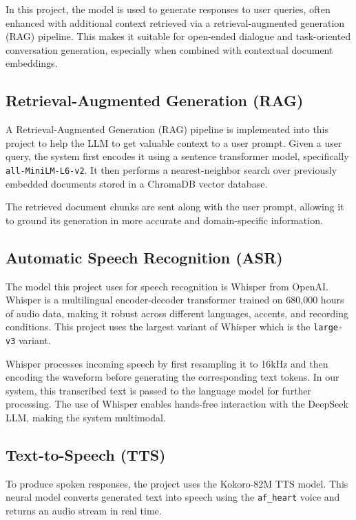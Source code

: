 \documentclass[twocolumn]{article}
\begin{document}
In this project, the model is used to generate responses to user queries, often enhanced with additional context retrieved via a retrieval-augmented generation (RAG) pipeline. This makes it suitable for open-ended dialogue and task-oriented conversation generation, especially when combined with contextual document embeddings.

\subsection{Retrieval-Augmented Generation (RAG)}
A Retrieval-Augmented Generation (RAG) pipeline is implemented into this project to help the LLM to get valuable context to a user prompt. Given a user query, the system first encodes it using a sentence transformer model, specifically \texttt{all-MiniLM-L6-v2}\cite{allminilm2021}. It then performs a nearest-neighbor search over previously embedded documents stored in a ChromaDB vector database\cite{chromadb2023}.

The retrieved document chunks are sent along with the user prompt, allowing it to ground its generation in more accurate and domain-specific information.

\subsection{Automatic Speech Recognition (ASR)}
The model this project uses for speech recognition is Whisper from OpenAI. Whisper is a multilingual encoder-decoder transformer trained on 680,000 hours of audio data, making it robust across different languages, accents, and recording conditions\cite{radford2022whisper}. This project uses the largest variant of Whisper which is the \texttt{large-v3} variant.

Whisper processes incoming speech by first resampling it to 16kHz and then encoding the waveform before generating the corresponding text tokens. In our system, this transcribed text is passed to the language model for further processing. The use of Whisper enables hands-free interaction with the DeepSeek LLM, making the system multimodal.

\subsection{Text-to-Speech (TTS)}
To produce spoken responses, the project uses the Kokoro-82M TTS model\cite{kokoro82m}. This neural model converts generated text into speech using the \texttt{af\_heart} voice and returns an audio stream in real time.
\end{document}
